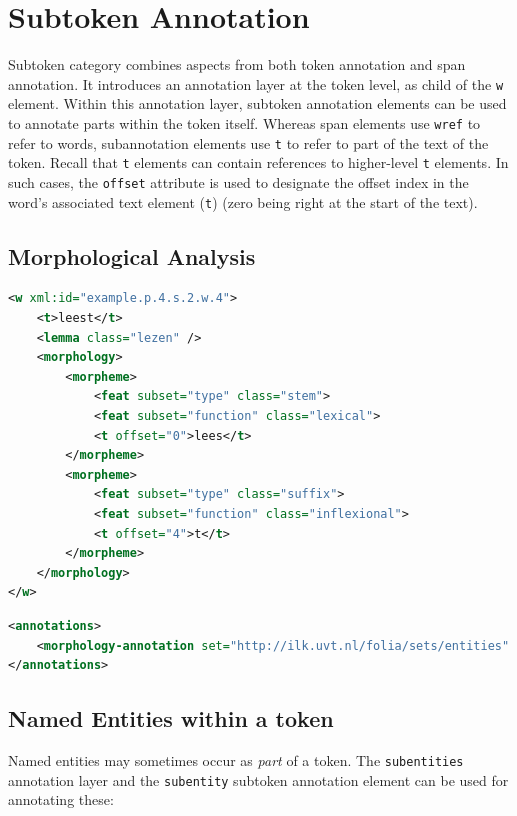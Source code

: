 \documentclass[a4paper,12pt]{report}
\begin{document}
\section{Subtoken Annotation}

Subtoken category combines aspects from both token annotation and span annotation. It introduces an annotation layer at the token level, as child of the \texttt{w} element. Within this annotation layer, subtoken annotation elements can be used to annotate parts within the token itself. Whereas span elements use \texttt{wref} to refer to words, subannotation elements use \texttt{t} to refer to part of the text of the token. Recall that \texttt{t} elements can contain references to higher-level \texttt{t} elements. In such cases, the \texttt{offset} attribute is used to designate the offset index in the word's associated text element (\texttt{t}) (zero being right at the start of the text).

\subsection{Morphological Analysis}


\begin{lstlisting}[language=xml]
<w xml:id="example.p.4.s.2.w.4">
    <t>leest</t>
    <lemma class="lezen" />
    <morphology>
        <morpheme>
            <feat subset="type" class="stem">
            <feat subset="function" class="lexical">
            <t offset="0">lees</t>
        </morpheme>
        <morpheme>
            <feat subset="type" class="suffix">
            <feat subset="function" class="inflexional">
            <t offset="4">t</t>
        </morpheme>
    </morphology>
</w>
\end{lstlisting}


\begin{lstlisting}[language=xml]
<annotations>
    <morphology-annotation set="http://ilk.uvt.nl/folia/sets/entities" />
</annotations>
\end{lstlisting}

\subsection{Named Entities within a token}

Named entities may sometimes occur as \emph{part} of a token. The \texttt{subentities} annotation layer and the \texttt{subentity} subtoken annotation element can be used for annotating these:  
\end{document}
